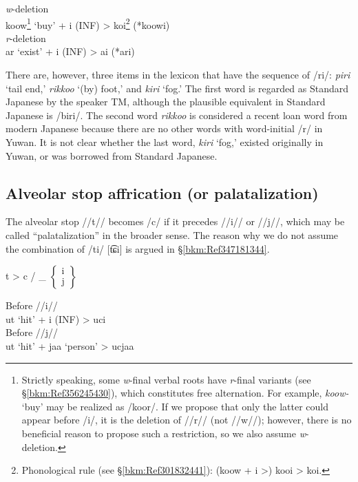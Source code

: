 \ex
\ea \textit{w}{}-deletion\\
     koow\footnote{Strictly speaking, some \textit{w}{}-final verbal roots have \textit{r}{}-final variants (see §\ref{bkm:Ref356245430}), which constitutes free alternation. For example, \textit{koow-} ‘buy’ may be realized as /koor/. If we propose that only the latter could appear before /i/, it is the deletion of //r// (not //w//); however, there is no beneficial reason to propose such a restriction, so we also assume \textit{w}{}-deletion.}   ‘buy’   +  i  (INF)  >  koi\footnote{Phonological rule (see §\ref{bkm:Ref301832441}): (koow + i >) kooi > koi.}  (*koowi)\\
\ex \textit{r}{}-deletion\\
      ar   ‘exist’   +   i   (INF)   >   ai   (*ari)\\
\z
\z

There are, however, three items in the lexicon that have the sequence of /ri/: \textit{piri} ‘tail end,’ \textit{rikkoo} ‘(by) foot,’ and \textit{kiri} ‘fog.’ The first word is regarded as Standard Japanese by the speaker TM, although the plausible equivalent in Standard Japanese is /biri/. The second word \textit{rikkoo} is considered a recent loan word from modern Japanese because there are no other words with word-initial /r/ in Yuwan. It is not clear whether the last word, \textit{kiri} ‘fog,’ existed originally in Yuwan, or was borrowed from Standard Japanese.

\subsection{Alveolar stop affrication (or palatalization)}
\label{bkm:Ref347180796}\hypertarget{RefHeadingToc395696979}{}
The alveolar stop //t// becomes /c/ if it precedes //i// or //j//, which may be called “palatalization” in the broader sense. The reason why we do not assume the combination of /ti/ [t͡ɕi] is argued in §\ref{bkm:Ref347181344}.

\ea t   >   c  /  \_ $\left\{\begin{array}{c} \text{i}\\\text{j}\end{array}\right\}$ 

\ex
\ea Before //i//\\
    ut   ‘hit’   +   i   (INF)   >   uci\\
\ex Before //j//\\
    ut   ‘hit’   +   jaa   ‘person’   >   ucjaa\\
\z
\z

